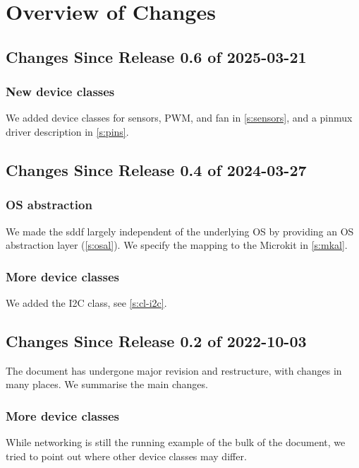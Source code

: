 \documentclass[a4paper,12pt]{report}
\begin{document}
\chapter{Overview of Changes}

\section{Changes Since Release 0.6 of 2025-03-21}
\subsection{New device classes}
We added device classes for sensors, PWM, and fan in \autoref{s:sensors},
and a pinmux driver description in  \autoref{s:pins}.

\section{Changes Since Release 0.4 of 2024-03-27}

\subsection{OS abstraction}

We made the \gls{sddf} largely independent of the underlying OS by
providing an OS abstraction layer (\autoref{s:osal}). We specify the
mapping to the Microkit in \autoref{s:mkal}.

\subsection{More device classes}

We added the I2C class, see \autoref{s:cl-i2c}.

\section{Changes Since Release 0.2 of 2022-10-03}

The document has undergone major revision and restructure, with
changes in many places. We summarise the main changes.

\subsection{More device classes}

While networking is still the running example of the bulk of the
document, we tried to point out where other device classes may differ.
\end{document}
